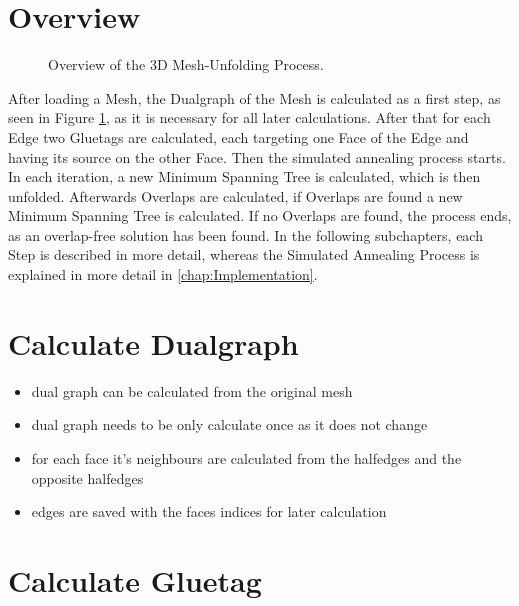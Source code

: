 \documentclass[draft,final]{vutinfth} %
\begin{document}
\section{Overview}

\begin{figure}

\caption{Overview of the 3D Mesh-Unfolding Process.}
\label{fig:overview}
\end{figure}

After loading a Mesh, the Dualgraph of the Mesh is calculated as a first step, as seen in Figure \ref{fig:overview}, as it is necessary for all later calculations. After that for each Edge two Gluetags are calculated, each targeting one Face of the Edge and having its source on the other Face. Then the simulated annealing process starts. In each iteration, a new Minimum Spanning Tree is calculated, which is then unfolded. Afterwards Overlaps are calculated, if Overlaps are found a new Minimum Spanning Tree is calculated. If no Overlaps are found, the process ends, as an overlap-free solution has been found. In the following subchapters, each Step is described in more detail, whereas the Simulated Annealing Process is explained in more detail in \autoref{chap:Implementation}.

\section{Calculate Dualgraph}

\begin{itemize}
	\item dual graph can be calculated from the original mesh 
	\item dual graph needs to be only calculate once as it does not change
	\item for each face it's neighbours are calculated from the halfedges and the opposite halfedges
	\item edges are saved with the faces indices for later calculation
\end{itemize}

\section{Calculate Gluetag}
\end{document}
